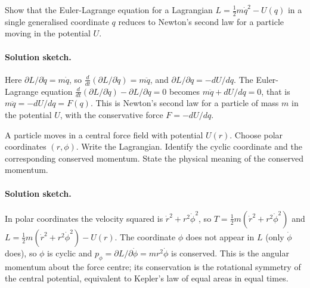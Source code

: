 \begin{exercise}
Show that the Euler-Lagrange equation for a Lagrangian $L = \tfrac{1}{2}
m \dot{q}^2 - U(q)$ in a single generalised coordinate $q$ reduces to
Newton's second law for a particle moving in the potential $U$.

\paragraph{Solution sketch.} Here $\partial L/\partial\dot q = m\dot q$,
so $\tfrac{d}{dt}(\partial L/\partial\dot q) = m\ddot q$, and $\partial
L/\partial q = -dU/dq$. The Euler-Lagrange equation $\tfrac{d}{dt}
(\partial L/\partial\dot q) - \partial L/\partial q = 0$ becomes $m\ddot
q + dU/dq = 0$, that is $m\ddot q = -dU/dq = F(q)$. This is Newton's
second law for a particle of mass $m$ in the potential $U$, with the
conservative force $F = -dU/dq$.
\end{exercise}

\begin{exercise}
A particle moves in a central force field with potential $U(r)$.
Choose polar coordinates $(r, \phi)$. Write the Lagrangian. Identify
the cyclic coordinate and the corresponding conserved momentum. State
the physical meaning of the conserved momentum.

\paragraph{Solution sketch.} In polar coordinates the velocity squared
is $\dot r^2 + r^2\dot\phi^2$, so $T = \tfrac12 m(\dot r^2 +
r^2\dot\phi^2)$ and $L = \tfrac12 m(\dot r^2 + r^2\dot\phi^2) - U(r)$.
The coordinate $\phi$ does not appear in $L$ (only $\dot\phi$ does), so
$\phi$ is cyclic and $p_\phi = \partial L/\partial\dot\phi =
mr^2\dot\phi$ is conserved. This is the angular momentum about the
force centre; its conservation is the rotational symmetry of the central
potential, equivalent to Kepler's law of equal areas in equal times.
\end{exercise}

